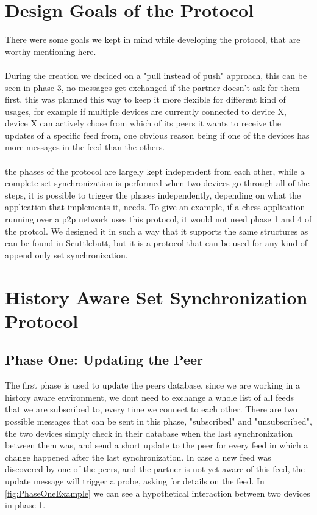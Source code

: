 \section{Design Goals of the Protocol}

There were some goals we kept in mind while developing the protocol, that are worthy mentioning here.
\\
\\
During the creation we decided on a "pull instead of push" approach, this can be seen in phase 3, no messages get exchanged if the partner doesn't ask for them first, this was planned this way to keep it more flexible for different kind of usages, for example if multiple devices are currently connected to device X, device X can actively chose from which of its peers it wants to receive the updates of a specific feed from, one obvious reason being if one of the devices has more messages in the feed than the others.
\\
\\
the phases of the protocol are largely kept independent from each other, while a complete set synchronization is performed when two devices go through all of the steps, it is possible to trigger the phases independently, depending on what the application that implements it, needs. To give an example, if a chess application running over a p2p network uses this protocol, it would not need phase 1 and 4 of the protcol. We designed it in such a way that it supports the same structures as can be found in Scuttlebutt, but it is a protocol that can be used for any kind of append only set synchronization.

\section{History Aware Set Synchronization Protocol}
\subsection{Phase One: Updating the Peer}

The first phase is used to update the peers database, since we are working in a history aware environment, we dont need to exchange a whole list of all feeds that we are subscribed to, every time we connect to each other. There are two possible messages that can be sent in this phase, "subscribed" and "unsubscribed", the two devices simply check in their database when the last synchronization between them was, and send a short update to the peer for every feed in which a change happened after the last synchronization. In case a new feed was discovered by one of the peers, and the partner is not yet aware of this feed, the update message will trigger a probe, asking for details on the feed. In \ref{fig:PhaseOneExample} we can see a hypothetical interaction between two devices in phase 1.

